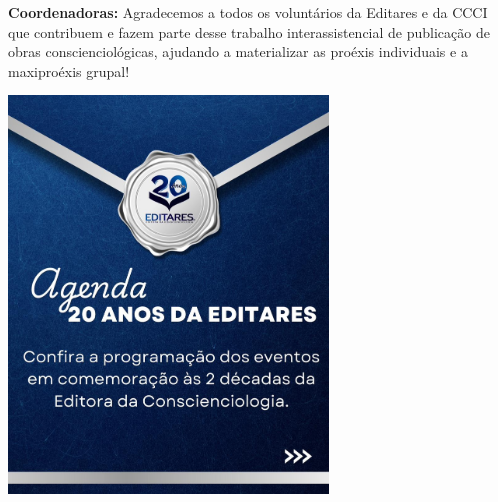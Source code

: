 \documentclass{gescons}
\begin{document}
\begin{multicols}{2}
\textbf{Coordenadoras:} Agradecemos a todos os voluntários da Editares e da CCCI que contribuem e fazem parte desse trabalho interassistencial de publicação de obras conscienciológicas, ajudando a materializar as proéxis individuais e a maxiproéxis grupal!

    \begin{center}
        \includegraphics[width=8.5cm,trim={0 740 0 50},clip]{articles/resumo/fotos/editares-20anos.jpg}
    \end{center}




        
    \end{multicols}



\end{document}
